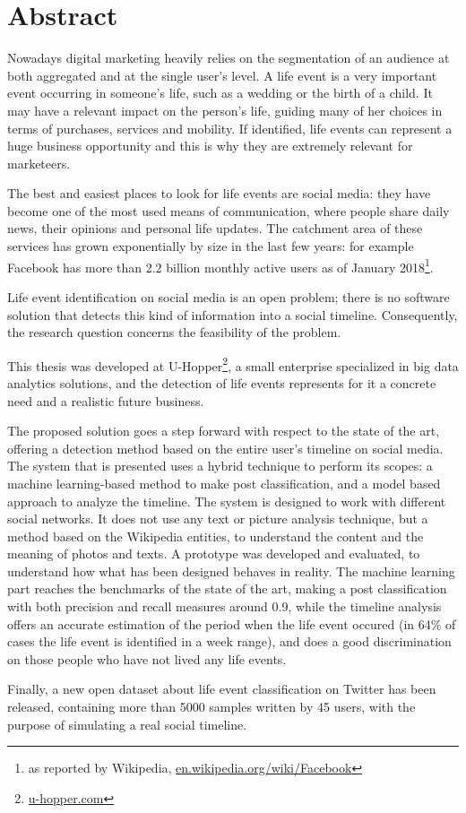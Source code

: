 \chapter*{Abstract} %
\label{summary}
Nowadays digital marketing heavily relies on the segmentation of an audience at both aggregated and at the single user's level. A life event is a very important event occurring in someone's life, such as a wedding or the birth of a child. It may have a relevant impact on the person's life, guiding many of her choices in terms of purchases, services and mobility. If identified, life events can represent a huge business opportunity and this is why they are extremely relevant for marketeers. 

The best and easiest places to look for life events are social media: they have become one of the most used means of communication, where people share daily news, their opinions and personal life updates. The catchment area of these services has grown exponentially by size in the last few years: for example Facebook has more than 2.2 billion monthly active users as of January 2018\footnote{as reported by Wikipedia, \url{en.wikipedia.org/wiki/Facebook}}.

Life event identification on social media is an open problem; there is no software solution that detects this kind of information into a social timeline. Consequently, the research question concerns the feasibility of the problem.

This thesis was developed at U-Hopper\footnote{\url{u-hopper.com}}, a small enterprise specialized in big data analytics solutions, and the detection of life events represents for it a concrete need and a realistic future business.

The proposed solution goes a step forward with respect to the state of the art, offering a detection method based on the entire user's timeline on social media. The system that is presented uses a hybrid technique to perform its scopes: a machine learning-based method to make post classification, and a model based approach to analyze the timeline. The system is designed to work with different social networks. It does not use any text or picture analysis technique, but a method based on the Wikipedia entities, to understand the content and the meaning of photos and texts. A prototype was developed and evaluated, to understand how what has been designed behaves in reality. The machine learning part reaches the benchmarks of the state of the art, making a post classification with both precision and recall measures around 0.9, while the timeline analysis offers an accurate estimation of the period when the life event occured (in 64\% of cases the life event is identified in a week range), and does a good discrimination on those people who have not lived any life events.

Finally, a new open dataset about life event classification on Twitter has been released, containing more than 5000 samples written by 45 users, with the purpose of simulating a real social timeline.
